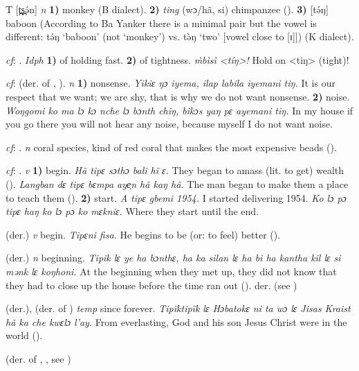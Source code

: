 \begin{letter}{T}
 [t̪s̪ə́n] \textit{n} \textbf{1)} monkey (B dialect). \textbf{2)} \textit{ting} (wɔ/hã, si) chimpanzee (\citealt{Pichl1967}). \textbf{3)} [tə́ŋ] baboon (According to Ba Yanker there is a minimal pair but the vowel is different: tə́ŋ ‘baboon' (not ‘monkey') vs. tə̀ŋ ‘two' [vowel close to [ɪ]]) (K dialect).

 \textit{cf}: . \textit{Idph} \textbf{1)} of holding fast. \textbf{2)} of tightness. \textit{\`{m}bìsì <tíŋ>!} Hold on <tiŋ> (tight)!

 \textit{cf}:  (der. of , ). \textit{n} \textbf{1)} nonsense. \textit{Yikiɛ ŋɔ iyema, ilap labila iyemani tiŋ.} It is our respect that we want; we are shy, that is why we do not want nonsense. \textbf{2)} noise. \textit{Woŋgomi ko ma lɔ kɔ nche lɔ bɔnth chiŋ, bikɔs yaŋ pɛ ayemani tiŋ.} In my house if you go there you will not hear any noise, because myself I do not want noise.

 \textit{cf}: . \textit{n} coral species, kind of red coral that makes the most expensive beads (\citealt{Pichl1967}). 

 \textit{cf}: . \textit{v} \textbf{1)} begin. \textit{Hã tipɛ sɔthɔ bali hĩ ɛ.} They began to amass (lit. to get) wealth (\citealt{Pichl1967}). \textit{Langban dɛ tipɛ bɛmpa aye̹n hã kaŋ hã.} The man began to make them a place to teach them (\citealt{Pichl1967}). \textbf{2)} start. \textit{A tipɛ gbemi 1954.} I started delivering 1954. \textit{Ko lɔ pɔ tipɛ haŋ ko lɔ pɔ ko mɛkniɛ.} Where they start until the end.

 (der.) \textit{v} begin. \textit{Tipɛni fisa.} He begins to be (or: to feel) better (\citealt{Pichl1967}).

 (der.) \textit{n} beginning. \textit{Tipik lɛ ye ha bɔnthɛ, ha ka silan lɛ ha	bi ha kantha kil lɛ si mənk lɛ koŋhoni.} At the beginning when they met up, they did not know that they had to close up the house before the time ran out (\citealt{Pichl1967}). der.  (see )

 (der.), (der. of ) \textit{temp} since forever. \textit{Tipïktipïk lɛ Hɔbatokɛ ni ta wɔ lɛ Jisas Kraist hã ka che kwɛlɔ l'ay.} From everlasting, God and his son Jesus Christ were in the world (\citealt{Pichl1967}). 

 (der. of , , see ) 


\end{letter}
